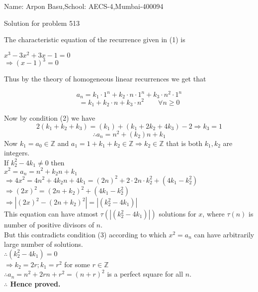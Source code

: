 \documentclass[a4paper,10pt]{article}
\begin{document}
\begin{center}


Name: Arpon Basu,School: AECS-4,Mumbai-400094

Solution for problem 513
\end{center}

  The characteristic equation of the recurrence given in (1) is 
      \begin{center}
	  $x^3-3x^2+3x-1=0$ \\
	  $ \Rightarrow (x-1)^3=0$
      \end{center}
Thus by the theory of homogeneous linear recurrences we get that 
   \begin{center}
     $$ a_{n}=k_{1}\cdot 1^n + k_{2}\cdot n \cdot 1^n +  k_{3}\cdot n^2 \cdot 1^n $$
     $$ =k_{1} + k_{2}\cdot n  +  k_{3} \cdot n^2 \qquad \forall n \ge 0 $$
   \end{center}

 
  Now by condition (2) we have 
  $$2(k_{1} + k_{2}  +  k_{3})=(k_{1}) + (k_{1} + 2k_{2}  +  4k_{3})-2 \Rightarrow k_{3}=1 $$
  $$\therefore  a_{n}=n^2 + (k_{2})n+k_{1}  $$
  Now $k_{1}=a_{0} \in \mathbb{Z}$ and $a_{1}=1+k_{1}+k_{2} \in \mathbb{Z} \Rightarrow  k_{2} \in \mathbb{Z}$ that is both $k_{1},k_{2}$ are integers.\\
  If $k_{2}^2 -4k_{1} \neq 0$ then \\
  
  $x^2 = a_{n}=n^2+k_{2}n+k_{1}$\\
  $\Rightarrow 4x^2=4n^2+4k_{2}n+4k_{1}=(2n)^2+2\cdot2n\cdot k_{2}^2 + (4k_{1}-k_{2}^2 )$\\
  $\Rightarrow (2x)^2=(2n+k_{2})^2+ (4k_{1}-k_{2}^2 )$\\
  $\Rightarrow |(2x)^2-(2n+k_{2})^2|= |(k_{2}^2 - 4k_{1})|$\\
  This equation can have atmost $\tau(|(k_{2}^2 - 4k_{1})|)$ solutions for $x$, where $\tau(n)$ is number of positive divisors of $n$.\\
  But this contradicts condition (3) according to which $x^2=a_{n}$ can have arbitrarily large number of solutions.\\
  $\therefore (k_{2}^2 - 4k_{1})=0$\\
  $\Rightarrow k_{2}=2r;k_{1}=r^2 $ for some $r \in \mathbb{Z}$\\
  $\therefore a_{n}=n^2+2rn+r^2=(n+r)^2$ is a perfect square for all $n$.\\
  
  \textbf{$\therefore$ Hence proved.}  
    
    
\end{document}
